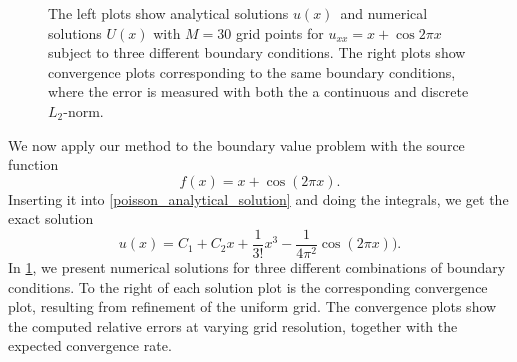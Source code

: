 \begin{figure}[tb]
	\caption{\label{poisson_numerical_solutions}
		The left plots show analytical solutions $u(x)$ and numerical solutions $U(x)$ with $M=30$ grid points for $u_{xx} = x + \cos{2 \pi x}$ subject to three different boundary conditions.
		The right plots show convergence plots corresponding to the same boundary conditions, where the error is measured with both the a continuous and discrete $L_2$-norm.
	}
\end{figure}

We now apply our method to the boundary value problem with the source function 
\begin{equation*}
f(x) = x + \cos(2 \pi x).
\end{equation*}
Inserting it into \cref{poisson_analytical_solution} and doing the integrals, we get the exact solution
\begin{equation*}
u(x) = C_1 + C_2 x + \frac{1}{3!}x^3 - \frac{1}{4 \pi^2}\cos(2 \pi x)).
\end{equation*}
In \cref{poisson_numerical_solutions}, we present numerical solutions for three different combinations of boundary conditions. 
To the right of each solution plot is the corresponding convergence plot, 
resulting from refinement of the uniform grid. 
The convergence plots show the computed relative errors at varying grid resolution, 
together with the expected convergence rate. 

